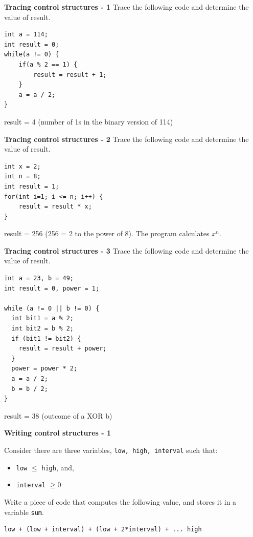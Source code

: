 \begin{questions}
\question \textbf{Tracing control structures - 1}
Trace the following code and determine the value of result.

\begin{lstlisting}
int a = 114;
int result = 0;
while(a != 0) {
	if(a % 2 == 1) {
		result = result + 1;
	}
	a = a / 2;
}
\end{lstlisting}
\begin{solution}
result = 4 (number of 1s in the binary version of 114)
\end{solution}

\question \textbf{Tracing control structures - 2}
Trace the following code and determine the value of result.

\begin{lstlisting}
int x = 2;
int n = 8;
int result = 1;
for(int i=1; i <= n; i++) {
	result = result * x;
}		
\end{lstlisting}
\begin{solution}
result = 256 (256 = 2 to the power of 8). The program calculates $x^n$.
\end{solution}

\question \textbf{Tracing control structures - 3}
Trace the following code and determine the value of result.

\begin{lstlisting}
int a = 23, b = 49;
int result = 0, power = 1;

while (a != 0 || b != 0) {
  int bit1 = a % 2;
  int bit2 = b % 2;
  if (bit1 != bit2) {
    result = result + power;
  }
  power = power * 2;
  a = a / 2;
  b = b / 2;
}
\end{lstlisting}

\begin{solution}
result = 38	(outcome of a XOR b)
\end{solution}

\question \textbf{Writing control structures - 1}

Consider there are three variables, \texttt{low, high, interval} such that:

\begin{itemize}
	\item \texttt{low} $\leq$ \texttt{high}, and,
	\item \texttt{interval} $\geq 0$
\end{itemize}

Write a piece of code that computes the following value, and stores it in a variable \texttt{sum}.

\begin{verbatim}
low + (low + interval) + (low + 2*interval) + ... high


\end{verbatim}
\end{questions}
